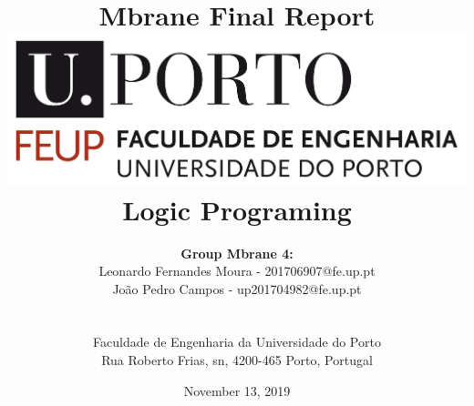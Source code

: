 \documentclass[a4paper]{article}
\begin{document}
\setlength{\textwidth}{16cm}
\setlength{\textheight}{22cm}

\title{\Huge\textbf{Mbrane}\linebreak\linebreak\linebreak
\Large\textbf{Final Report}\linebreak\linebreak
\linebreak\linebreak
\includegraphics[scale=0.1]{feup-logo.png}\linebreak\linebreak
\linebreak\linebreak
\Large{Logic Programing}\linebreak
}

\author{\textbf{Group Mbrane 4:}\\ Leonardo Fernandes Moura - 201706907@fe.up.pt \\ João Pedro Campos - up201704982@fe.up.pt \\\linebreak\linebreak \\
 \\ Faculdade de Engenharia da Universidade do Porto \\ Rua Roberto Frias, s\/n, 4200-465 Porto, Portugal \linebreak\linebreak\linebreak
\linebreak\linebreak\vspace{1cm}}
\date{November 13, 2019}
\maketitle
\thispagestyle{empty}

\end{document}
